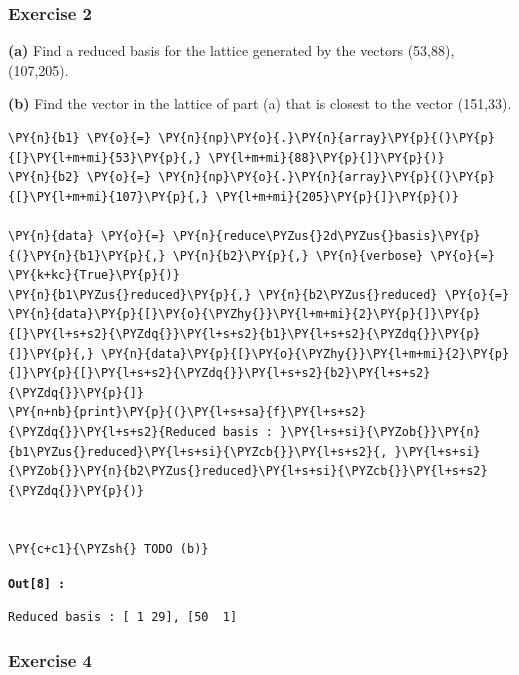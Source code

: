 \documentclass[a4paper,12pt]{article}
\begin{document}
    
    \subsubsection{Exercise 2}\label{exercise-2}

\textbf{(a)} Find a reduced basis for the lattice generated by the
vectors (53,88), (107,205).

\textbf{(b)} Find the vector in the lattice of part (a) that is closest
to the vector (151,33).

    \begin{tcolorbox}[breakable, size=fbox, boxrule=1pt, pad at break*=1mm,colback=cellbackground, colframe=cellborder]
\begin{Verbatim}[commandchars=\\\{\}]
\PY{n}{b1} \PY{o}{=} \PY{n}{np}\PY{o}{.}\PY{n}{array}\PY{p}{(}\PY{p}{[}\PY{l+m+mi}{53}\PY{p}{,} \PY{l+m+mi}{88}\PY{p}{]}\PY{p}{)}
\PY{n}{b2} \PY{o}{=} \PY{n}{np}\PY{o}{.}\PY{n}{array}\PY{p}{(}\PY{p}{[}\PY{l+m+mi}{107}\PY{p}{,} \PY{l+m+mi}{205}\PY{p}{]}\PY{p}{)}

\PY{n}{data} \PY{o}{=} \PY{n}{reduce\PYZus{}2d\PYZus{}basis}\PY{p}{(}\PY{n}{b1}\PY{p}{,} \PY{n}{b2}\PY{p}{,} \PY{n}{verbose} \PY{o}{=} \PY{k+kc}{True}\PY{p}{)}
\PY{n}{b1\PYZus{}reduced}\PY{p}{,} \PY{n}{b2\PYZus{}reduced} \PY{o}{=} \PY{n}{data}\PY{p}{[}\PY{o}{\PYZhy{}}\PY{l+m+mi}{2}\PY{p}{]}\PY{p}{[}\PY{l+s+s2}{\PYZdq{}}\PY{l+s+s2}{b1}\PY{l+s+s2}{\PYZdq{}}\PY{p}{]}\PY{p}{,} \PY{n}{data}\PY{p}{[}\PY{o}{\PYZhy{}}\PY{l+m+mi}{2}\PY{p}{]}\PY{p}{[}\PY{l+s+s2}{\PYZdq{}}\PY{l+s+s2}{b2}\PY{l+s+s2}{\PYZdq{}}\PY{p}{]}
\PY{n+nb}{print}\PY{p}{(}\PY{l+s+sa}{f}\PY{l+s+s2}{\PYZdq{}}\PY{l+s+s2}{Reduced basis : }\PY{l+s+si}{\PYZob{}}\PY{n}{b1\PYZus{}reduced}\PY{l+s+si}{\PYZcb{}}\PY{l+s+s2}{, }\PY{l+s+si}{\PYZob{}}\PY{n}{b2\PYZus{}reduced}\PY{l+s+si}{\PYZcb{}}\PY{l+s+s2}{\PYZdq{}}\PY{p}{)}


\PY{c+c1}{\PYZsh{} TODO (b)}
\end{Verbatim}
\end{tcolorbox}

\begin{tcolorbox}[colback=white, colframe=gray!60, boxrule=0.5pt]
\texttt{\textbf{Out[8] :}}
    \begin{Verbatim}[commandchars=\\\{\}]
Reduced basis : [ 1 29], [50  1]
    \end{Verbatim}
\end{tcolorbox}


 \subsubsection{Exercise 4}\label{exercise-4}
\end{document}
